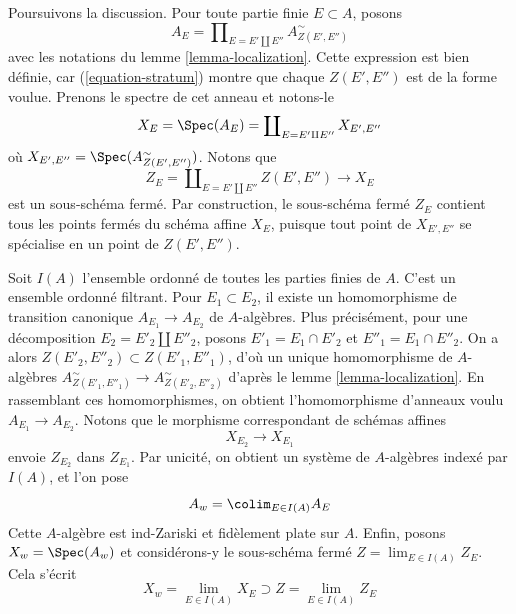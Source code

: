 \noindent
Poursuivons la discussion.
Pour toute partie finie $E \subset A$, posons
\begin{equation}
\label{equation-ring}
A_E = \prod\nolimits_{E = E' \amalg E''} A_{Z(E', E'')}^\sim
\end{equation}
avec les notations du lemme \ref{lemma-localization}. Cette expression est bien d\'efinie, car
(\ref{equation-stratum}) montre que chaque $Z(E', E'')$ est de la forme voulue.
Prenons le spectre de cet anneau et notons-le
\begin{equation}
\label{equation-spectrum}
X_E = \Spec(A_E) = \coprod\nolimits_{E = E' \amalg E''} X_{E', E''}
\end{equation}
o\`u $X_{E', E''} = \Spec(A_{Z(E', E'')}^\sim)$. Notons que
\begin{equation}
\label{equation-closed}
Z_E = \coprod\nolimits_{E = E' \amalg E''} Z(E', E'')
\longrightarrow
X_E
\end{equation}
est un sous-sch\'ema ferm\'e. Par construction, le sous-sch\'ema ferm\'e $Z_E$
contient tous les points ferm\'es du sch\'ema affine $X_E$, puisque tout point
de $X_{E', E''}$ se sp\'ecialise en un point de $Z(E', E'')$.

\medskip\noindent
Soit $I(A)$ l'ensemble ordonn\'e de toutes les parties finies de $A$.
C'est un ensemble ordonn\'e filtrant. Pour $E_1 \subset E_2$, il existe
un homomorphisme de transition canonique $A_{E_1} \to A_{E_2}$ de $A$-alg\`ebres.
Plus pr\'ecis\'ement, pour une d\'ecomposition $E_2 = E'_2 \amalg E''_2$, posons
$E'_1 = E_1 \cap E'_2$ et $E''_1 = E_1 \cap E''_2$. On a alors
$Z(E'_2, E''_2) \subset Z(E'_1, E''_1)$, d'o\`u un unique homomorphisme de $A$-alg\`ebres
$A_{Z(E'_1, E''_1)}^\sim \to A_{Z(E'_2, E''_2)}^\sim$ d'apr\`es le
lemme \ref{lemma-localization}. En rassemblant ces homomorphismes, on obtient
l'homomorphisme d'anneaux voulu $A_{E_1} \to A_{E_2}$. Notons que le morphisme correspondant
de sch\'emas affines
\begin{equation}
\label{equation-transition}
X_{E_2} \longrightarrow X_{E_1}
\end{equation}
envoie $Z_{E_2}$ dans $Z_{E_1}$. Par unicit\'e, on obtient un syst\`eme de
$A$-alg\`ebres index\'e par $I(A)$, et l'on pose
\begin{equation}
\label{equation-colimit-ring}
A_w = \colim_{E \in I(A)} A_E
\end{equation}
Cette $A$-alg\`ebre est ind-Zariski et fid\`element plate sur $A$.
Enfin, posons $X_w = \Spec(A_w)$ et consid\'erons-y le sous-sch\'ema ferm\'e
$Z = \lim_{E \in I(A)} Z_E$. Cela s'\'ecrit
\begin{equation}
\label{equation-final}
X_w = \lim_{E \in I(A)} X_E \supset Z = \lim_{E \in I(A)} Z_E
\end{equation}

